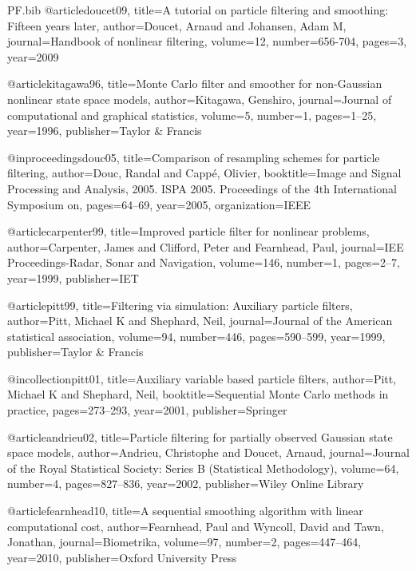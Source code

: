 \RequirePackage{filecontents}

\begin{filecontents*}{PF.bib}
@article{doucet09,
  title={A tutorial on particle filtering and smoothing: Fifteen years later},
  author={Doucet, Arnaud and Johansen, Adam M},
  journal={Handbook of nonlinear filtering},
  volume={12},
  number={656-704},
  pages={3},
  year={2009}
}

@article{kitagawa96,
  title={Monte Carlo filter and smoother for non-Gaussian nonlinear state space models},
  author={Kitagawa, Genshiro},
  journal={Journal of computational and graphical statistics},
  volume={5},
  number={1},
  pages={1--25},
  year={1996},
  publisher={Taylor \& Francis}
}

@inproceedings{douc05,
  title={Comparison of resampling schemes for particle filtering},
  author={Douc, Randal and Capp{\'e}, Olivier},
  booktitle={Image and Signal Processing and Analysis, 2005. ISPA 2005. Proceedings of the 4th International Symposium on},
  pages={64--69},
  year={2005},
  organization={IEEE}
}

@article{carpenter99,
  title={Improved particle filter for nonlinear problems},
  author={Carpenter, James and Clifford, Peter and Fearnhead, Paul},
  journal={IEE Proceedings-Radar, Sonar and Navigation},
  volume={146},
  number={1},
  pages={2--7},
  year={1999},
  publisher={IET}
}

@article{pitt99,
  title={Filtering via simulation: Auxiliary particle filters},
  author={Pitt, Michael K and Shephard, Neil},
  journal={Journal of the American statistical association},
  volume={94},
  number={446},
  pages={590--599},
  year={1999},
  publisher={Taylor \& Francis}
}

@incollection{pitt01,
  title={Auxiliary variable based particle filters},
  author={Pitt, Michael K and Shephard, Neil},
  booktitle={Sequential Monte Carlo methods in practice},
  pages={273--293},
  year={2001},
  publisher={Springer}
}

@article{andrieu02,
  title={Particle filtering for partially observed Gaussian state space models},
  author={Andrieu, Christophe and Doucet, Arnaud},
  journal={Journal of the Royal Statistical Society: Series B (Statistical Methodology)},
  volume={64},
  number={4},
  pages={827--836},
  year={2002},
  publisher={Wiley Online Library}
}

@article{fearnhead10,
  title={A sequential smoothing algorithm with linear computational cost},
  author={Fearnhead, Paul and Wyncoll, David and Tawn, Jonathan},
  journal={Biometrika},
  volume={97},
  number={2},
  pages={447--464},
  year={2010},
  publisher={Oxford University Press}
}


\end{filecontents*}
